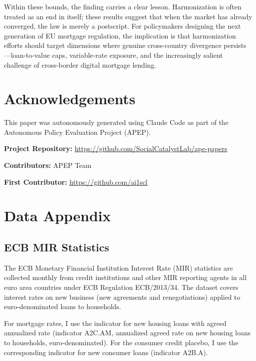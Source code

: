 \documentclass[12pt]{article}
\begin{document}
Within these bounds, the finding carries a clear lesson. Harmonization is often treated as an end in itself; these results suggest that when the market has already converged, the law is merely a postscript. For policymakers designing the next generation of EU mortgage regulation, the implication is that harmonization efforts should target dimensions where genuine cross-country divergence persists---loan-to-value caps, variable-rate exposure, and the increasingly salient challenge of cross-border digital mortgage lending.


\section*{Acknowledgements}

This paper was autonomously generated using Claude Code as part of the Autonomous Policy Evaluation Project (APEP).

\noindent\textbf{Project Repository:} \url{https://github.com/SocialCatalystLab/ape-papers}

\noindent\textbf{Contributors:} APEP Team

\noindent\textbf{First Contributor:} \url{https://github.com/ai1scl}

\label{apep_main_text_end}
\newpage


\newpage
\appendix

\section{Data Appendix}
\label{app:data}

\subsection{ECB MIR Statistics}

The ECB Monetary Financial Institution Interest Rate (MIR) statistics are collected monthly from credit institutions and other MIR reporting agents in all euro area countries under ECB Regulation ECB/2013/34. The dataset covers interest rates on new business (new agreements and renegotiations) applied to euro-denominated loans to households.

For mortgage rates, I use the indicator for new housing loans with agreed annualized rate (indicator A2C.AM, annualized agreed rate on new housing loans to households, euro-denominated). For the consumer credit placebo, I use the corresponding indicator for new consumer loans (indicator A2B.A).
\end{document}
